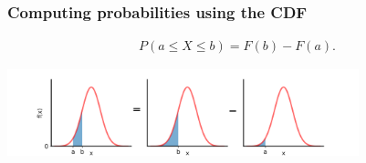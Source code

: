 \documentclass[9pt]{beamer}
\begin{document}
\begin{frame}
\frametitle{Computing probabilities using the CDF}



\vspace{-.7cm}

\begin{align*}
P(a \leq X \leq b) = F(b) - F(a).
\end{align*} 


\vspace{-.4cm}

\center \includegraphics[height=2.5cm]{images/normal_ab_a_b.png}

\vspace{0cm}




%

\end{frame}
\end{document}

